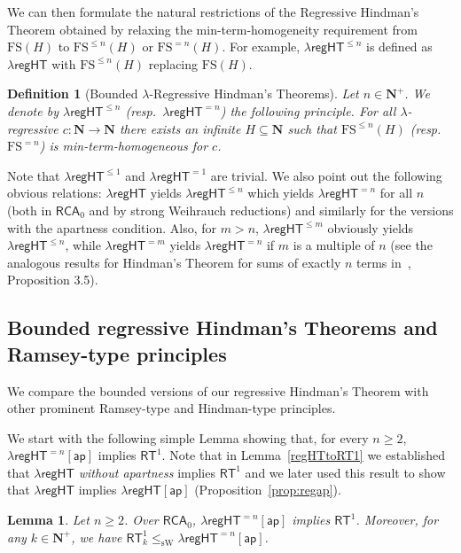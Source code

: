 \documentclass[a4paper,11pt]{article}
\newtheorem{definition}{Definition}
\newtheorem{lemma}{Lemma}
\newcommand\Nat{\mathbf{N}}
\newcommand\RCA{\mathsf{RCA}}
\newcommand\RT{\mathsf{RT}}
\newcommand\regHT{\mathsf{regHT}}
\newcommand\FS{\mathrm{FS}}
\newcommand\sW{\mathrm{sW}}
\newcommand\ap{\mathsf{ap}}
\begin{document}
We can then formulate the natural restrictions of the Regressive Hindman's Theorem obtained by relaxing the min-term-homogeneity requirement from $\FS(H)$ to $\FS^{\leq n}(H)$ or $\FS^{=n}(H)$. For example,  $\lambda\regHT^{\leq n}$ is defined as $\lambda\regHT$ with $\FS^{\leq n}(H)$ replacing $\FS(H)$. 

\begin{definition}[Bounded $\lambda$-Regressive Hindman's Theorems]
Let $n\in\Nat^+$. We denote by $\lambda\regHT^{\leq n}$ (resp.~$\lambda\regHT^{=n}$) the following principle. For all $\lambda$-regressive $c:\Nat \to \Nat$ there exists an infinite
$H\subseteq\Nat$ such that $\FS^{\leq n}(H)$ (resp.~$\FS^{=n}$) is min-term-homogeneous for $c$.
\end{definition}

Note that $\lambda\regHT^{\leq 1}$ and $\lambda\regHT^{=1}$ are trivial. 
We also point out the following obvious relations: $\lambda\regHT$ yields $\lambda\regHT^{\leq n}$ which yields
$\lambda\regHT^{=n}$ for all $n$ (both in $\RCA_0$ and by strong Weihrauch reductions) and similarly for the 
versions with the apartness condition. 
Also, for $m > n$, $\lambda\regHT^{\leq m}$ obviously yields $\lambda\regHT^{\leq n}$, while $\lambda\regHT^{=m}$ yields $\lambda\regHT^{=n}$ if $m$ is a multiple of $n$ (see the analogous results for Hindman's Theorem for sums of exactly $n$ terms in~\cite{Car-Kol-Lep-Zda:20}, Proposition 3.5).

\subsection{Bounded regressive Hindman's Theorems and Ramsey-type principles}

We compare the bounded versions of our regressive Hindman's Theorem with other prominent Ramsey-type and Hindman-type principles.

We start with the following simple Lemma showing that, for every $n\geq 2$, $\lambda\regHT^{=n}[\ap]$ implies $\RT^1$. Note that in Lemma~\ref{regHTtoRT1} we established that $\lambda\regHT$ {\em without apartness} implies $\RT^1$ and we later used this result to show that $\lambda\regHT$ implies $\lambda\regHT[\ap]$ (Proposition~\ref{prop:regap}).

\begin{lemma}\label{lem:rt1k}
Let $n\geq 2$. Over $\RCA_0$, $\lambda\regHT^{=n}[\ap]$ implies $\RT^1$. Moreover, for any $k\in\Nat^+$, we have $\RT^1_k \leq_\mathrm{\sW} \lambda\regHT^{=n}[\ap]$.
\end{lemma}
\end{document}
